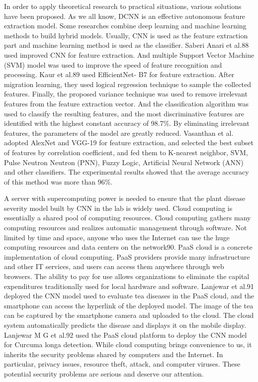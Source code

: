 In order to apply theoretical research to practical situations, various solutions have been proposed. As we all know, DCNN is an effective autonomous feature extraction model. Some researches combine deep learning and machine learning methods to build hybrid models. Usually, CNN is used as the feature extraction part and machine learning method is used as the classifier. Saberi Anari et al.88 used improved CNN for feature extraction. And multiple Support Vector Machine (SVM) model was used to improve the speed of feature recognition and processing. Kaur et al.89 used EfficientNet- B7 for feature extraction. After migration learning, they used logical regression technique to sample the collected features. Finally, the proposed variance technique was used to remove irrelevant features from the feature extraction vector. And the classification algorithm was used to classify the resulting features, and the most discriminative features are identified with the highest constant accuracy of 98.7\%. By eliminating irrelevant features, the parameters of the model are greatly reduced. Vasanthan et al. adopted AlexNet and VGG-19 for feature extraction, and selected the best subset of features by correlation coefficient, and fed them to K-nearest neighbor, SVM, Pulse Neutron Neutron (PNN), Fuzzy Logic, Artificial Neural Network (ANN) and other classifiers. The experimental results showed that the average accuracy of this method was more than 96\%.

A server with supercomputing power is needed to ensure that the plant disease severity model built by CNN in the lab is widely used. Cloud computing is essentially a shared pool of computing resources. Cloud computing gathers many computing resources and realizes automatic management through software. Not limited by time and space, anyone who uses the Internet can use the huge computing resources and data centers on the network90. PaaS cloud is a concrete implementation of cloud computing. PaaS providers provide many infrastructure and other IT services, and users can access them anywhere through web browsers. The ability to pay for use allows organizations to eliminate the capital expenditures traditionally used for local hardware and software. Lanjewar et al.91 deployed the CNN model used to evaluate tea diseases in the PaaS cloud, and the smartphone can access the hyperlink of the deployed model. The image of the tea can be captured by the smartphone camera and uploaded to the cloud. The cloud system automatically predicts the disease and displays it on the mobile display. Lanjewar M G et al.92 used the PaaS cloud platform to deploy the CNN model for Curcuma longa detection. While cloud computing brings convenience to us, it inherits the security problems shared by computers and the Internet. In particular, privacy issues, resource theft, attack, and computer viruses. These potential security problems are serious and deserve our attention.

